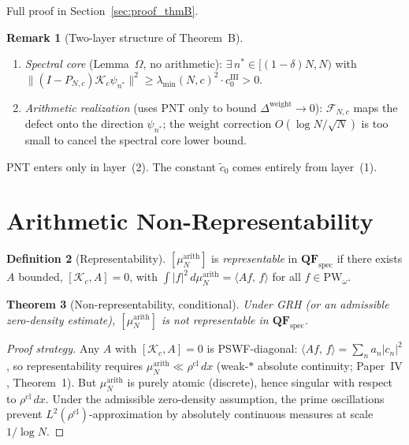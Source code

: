 \documentclass[12pt,a4paper]{amsart}
\newtheorem{theorem}{Theorem}[section]
\theoremstyle{definition}
\newtheorem{definition}[theorem]{Definition}
\newtheorem{remark}[theorem]{Remark}
\newcommand{\PW}{\mathrm{PW}_\omega}
\newcommand{\Kop}{\mathcal{K}_c}
\newcommand{\ip}[2]{\langle #1,\, #2\rangle}
\newcommand{\Fcal}{\mathcal{F}_{N,c}}
\newcommand{\muarith}{\mu^{\mathrm{arith}}_N}
\newcommand{\rhocl}{\rho^{\mathrm{cl}}}
\newcommand{\PN}{P_{N,c}}
\newcommand{\lmin}{\lambda_{\min}(N,c)}
\begin{document}
Full proof in Section~\ref{sec:proof_thmB}.

\begin{remark}[Two-layer structure of Theorem~B]
\begin{enumerate}[\rm(1)]
  \item \emph{Spectral core} (Lemma~$\Omega$, no arithmetic):
  $\exists\,n^*\in[(1-\delta)N,N)$ with
  $\|(I-\PN)\Kop\psi_{n^*}\|^2
  \ge\lmin^2\cdot c_0^{\mathrm{III}} > 0$.
  \item \emph{Arithmetic realization} (uses PNT only to bound
  $\Delta^{\mathrm{weight}}\to 0$):
  $\Fcal$ maps the defect onto the direction $\psi_{n^*}$;
  the weight correction $O(\log N/\sqrt{N})$ is too small
  to cancel the spectral core lower bound.
\end{enumerate}
PNT enters only in layer~(2). The constant $\tilde c_0$
comes entirely from layer~(1).
\end{remark}

\section{Arithmetic Non-Representability}\label{sec:nonrep}

\begin{definition}[Representability]\label{def:representability}
$[\muarith]$ is \emph{representable} in $\mathbf{QF}_{\mathrm{spec}}$
if there exists $A$ bounded, $[\Kop,A]=0$, with
$\int|f|^2\,d\muarith = \ip{Af}{f}$ for all $f\in\PW$.
\end{definition}

\begin{theorem}[Non-representability, conditional]%
\label{thm:nonrep}
Under GRH (or an admissible zero-density estimate),
$[\muarith]$ is not representable in $\mathbf{QF}_{\mathrm{spec}}$.
\end{theorem}

\begin{proof}[Proof strategy]
Any $A$ with $[\Kop,A]=0$ is PSWF-diagonal:
$\ip{Af}{f} = \sum_n a_n|c_n|^2$, so representability requires
$\muarith\ll\rhocl\,dx$ (weak-$*$ absolute continuity;
Paper~IV \cite{PaperIV}, Theorem~1).
But $\muarith$ is purely atomic (discrete), hence singular
with respect to $\rhocl\,dx$.
Under the admissible zero-density assumption, the prime
oscillations prevent $L^2(\rhocl)$-approximation by
absolutely continuous measures at scale $1/\log N$.
\end{proof}
\end{document}
